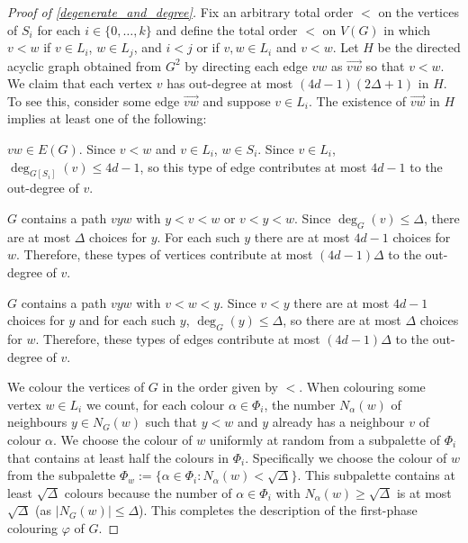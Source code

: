 \documentclass{patmorin}
\begin{document}
\begin{proof}[Proof of \cref{degenerate_and_degree}]
  Fix an arbitrary total order $<$ on the vertices of $S_i$ for each $i\in\{0,\ldots,k\}$ and define the total order $<$ on $V(G)$ in which $v <w$ if $v\in L_i$, $w\in L_j$, and $i<j$ or if $v,w\in L_i$ and $v<w$.  Let $H$ be the directed acyclic graph obtained from $G^2$ by directing each edge $vw$ as $\overrightarrow{vw}$ so that $v<w$.  We claim that each vertex $v$ has out-degree at most $(4d-1)(2\Delta+1)$ in $H$.  To see this, consider some edge $\overrightarrow{vw}$ and suppose $v\in L_i$.  The existence of $\overrightarrow{vw}$ in $H$ implies at least one of the following:
  \begin{compactenum}
    \item $vw\in E(G)$.  Since $v<w$ and $v\in L_i$, $w\in S_i$.  Since $v\in L_i$, $\deg_{G[S_i]}(v)\le 4d-1$, so this type of edge contributes at most $4d-1$ to the out-degree of $v$.
    \item $G$ contains a path $vyw$ with $y < v < w$ or $v < y < w$.  Since $\deg_G(v)\le\Delta$, there are at most $\Delta$ choices for $y$.  For each such $y$ there are at most $4d-1$ choices for $w$.  Therefore, these types of vertices contribute at most $(4d-1)\Delta$ to the out-degree of $v$.
    \item $G$ contains a path $vyw$ with $v < w < y$.  Since $v<y$ there are at most $4d-1$ choices for $y$ and for each such $y$, $\deg_G(y)\le\Delta$, so there are at most $\Delta$ choices for $w$.  Therefore, these types of edges contribute at most $(4d-1)\Delta$ to the out-degree of $v$.
  \end{compactenum}
  We colour the vertices of $G$ in the order given by $<$.  When colouring some vertex $w\in L_i$ we count, for each colour $\alpha\in \Phi_i$, the number $N_\alpha(w)$ of neighbours $y\in N_G(w)$ such that $y < w$ and $y$ already has a neighbour $v$ of colour $\alpha$.  We choose the colour of $w$ uniformly at random from a subpalette of $\Phi_i$ that contains at least half the colours in $\Phi_i$.  Specifically we choose the colour of $w$ from the subpalette $\Phi_w:=\{\alpha\in\Phi_i: N_{\alpha}(w)<\sqrt{\Delta}\}$.  This subpalette contains at least $\sqrt{\Delta}$ colours because the number of $\alpha\in\Phi_i$ with $N_\alpha(w)\ge \sqrt{\Delta}$ is at most $\sqrt{\Delta}$ (as $|N_G(w)|\leq \Delta$).
  This completes the description of the first-phase colouring $\varphi$ of $G$.


\end{proof}
\end{document}
